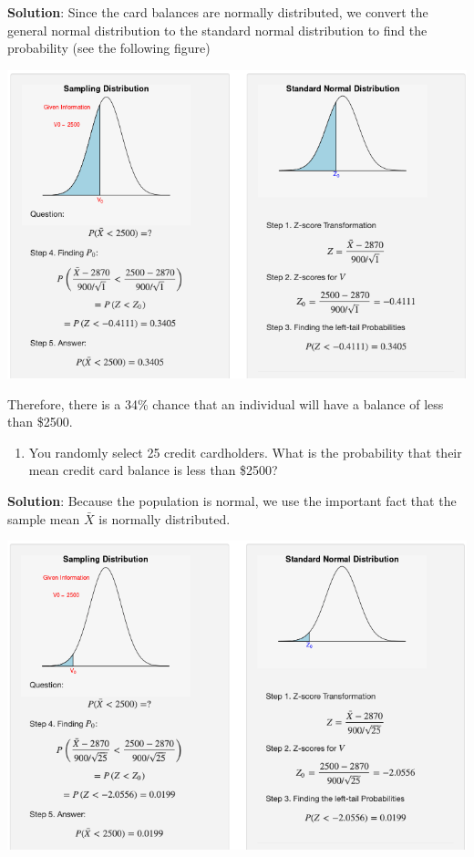 \documentclass[
]{book}
\providecommand{\tightlist}{%
  \setlength{\itemsep}{0pt}\setlength{\parskip}{0pt}}
\begin{document}
\textbf{Solution}: Since the card balances are normally distributed, we convert the general normal distribution to the standard normal distribution to find the probability (see the following figure)

\begin{center}\includegraphics[width=1\linewidth]{week05/example02-1} \end{center}

Therefore, there is a 34\% chance that an individual will have a balance of less than \$2500.

\hfill\break

\begin{enumerate}
\def\labelenumi{\arabic{enumi}.}
\setcounter{enumi}{1}
\tightlist
\item
  You randomly select 25 credit cardholders. What is the probability that their mean credit card balance is less than \$2500?
\end{enumerate}

\textbf{Solution}: Because the population is normal, we use the important fact that the sample mean \(\bar{X}\) is normally distributed.

\begin{center}\includegraphics[width=1\linewidth]{week05/example02-2} \end{center}
\end{document}
